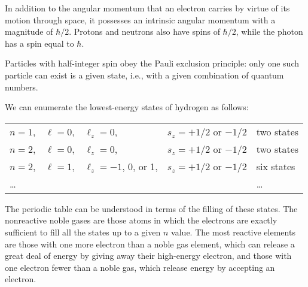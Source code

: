 In addition to the angular momentum that an electron carries
by virtue of its motion through space, it possesses an
intrinsic angular momentum with a magnitude of $\hbar/2$. Protons
and neutrons also have spins of $\hbar/2$, while the photon
has a spin equal to $\hbar$.

Particles with half-integer spin obey the Pauli exclusion
principle: only one such particle can exist is a given
state, i.e., with a given combination of quantum numbers.

We can enumerate the lowest-energy states of hydrogen as follows:

\noindent\begin{tabular}{|llll|l|}
\hline
  $n=1$, & $\ell=0$, & $\ell_z=0$, & $s_z=+1/2$ or $-1/2$ &	two states \\
  $n=2$, & $\ell=0$, & $\ell_z=0$, & $s_z=+1/2$ or $-1/2$ &	two states\\
  $n=2$, & $\ell=1$, & $\ell_z=-1$, 0, or 1, & $s_z=+1/2$ or $-1/2$ &	six states\\
	\ldots & & & & \ldots\\
\hline
\end{tabular}

\noindent The periodic table can be understood in terms of the filling
of these states. The nonreactive noble gases are those atoms
in which the electrons are exactly sufficient to fill all
the states up to a given $n$ value. The most reactive
elements are those with one more electron than a noble gas
element, which can release a great deal of energy by giving
away their high-energy electron, and those with one electron
fewer than a noble gas, which release energy by accepting an electron.
